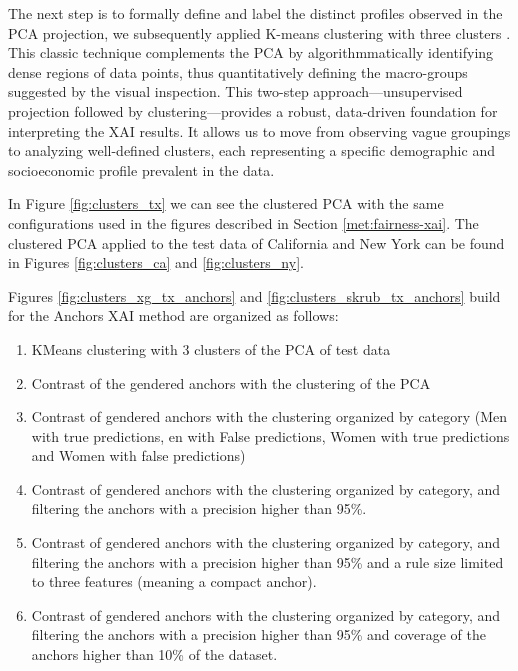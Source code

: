 

The next step is to formally define and label the distinct profiles observed in the PCA projection, we subsequently applied K-means clustering with three clusters \cite{kmeans-pca-ding}. This classic technique complements the PCA by algorithmmatically identifying dense regions of data points, thus quantitatively defining the macro-groups suggested by the visual inspection. This two-step approach—unsupervised projection followed by clustering—provides a robust, data-driven foundation for interpreting the XAI results. It allows us to move from observing vague groupings to analyzing well-defined clusters, each representing a specific demographic and socioeconomic profile prevalent in the data.

In Figure \ref{fig:clusters_tx} we can see the clustered PCA with the same configurations used in the figures described in Section \ref{met:fairness-xai}. The clustered PCA applied to the test data of California and New York can be found in Figures \ref{fig:clusters_ca} and \ref{fig:clusters_ny}.



Figures \ref{fig:clusters_xg_tx_anchors} and \ref{fig:clusters_skrub_tx_anchors} build for the Anchors XAI method are organized as follows:
\begin{enumerate}
    \item KMeans clustering with 3 clusters of the PCA of test data
    \item Contrast of the gendered anchors with the clustering of the PCA
	\item Contrast of gendered anchors with the clustering organized by category (Men with true predictions, en with False predictions, Women with true predictions and Women with false predictions)
	\item Contrast of gendered anchors with the clustering organized by category, and filtering the anchors with a precision higher than 95\%.
	\item Contrast of gendered anchors with the clustering organized by category, and filtering the anchors with a precision higher than 95\% and a rule size limited to three features (meaning a compact anchor).
	\item Contrast of gendered anchors with the clustering organized by category, and filtering the anchors with a precision higher than 95\% and coverage of the anchors higher than 10\% of the dataset.
\end{enumerate}

